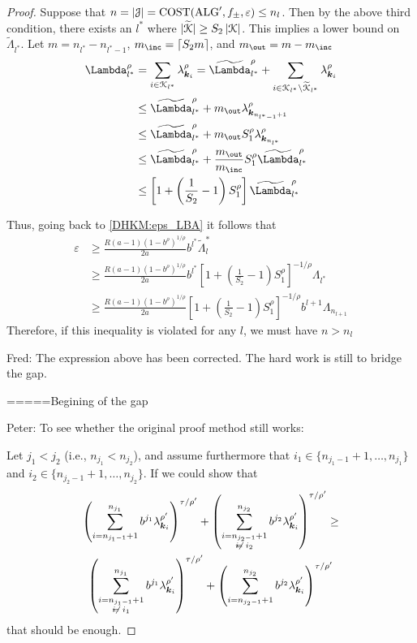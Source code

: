 \documentclass[USenglish]{article}
\theoremstyle{dgthm}
\theoremstyle{dgthm}
\theoremstyle{dgthm}
\theoremstyle{dgthm}
\theoremstyle{dgdef}
\theoremstyle{definition}
\DeclareMathOperator{\ALG}{ALG}
\DeclareMathOperator{\COST}{COST}
\newcommand{\tcalK}{\widetilde{\calK}}
\def\abs#1{\ensuremath{\left \lvert #1 \right \rvert}}
\newcommand{\normabs}[1]{\ensuremath{\lvert #1 \rvert}}
\newcommand{\FredNote}[1]{{\color{blue}Fred: #1}}
\newcommand{\PeterNote}[1]{{\color{orange}Peter: #1}}
\newcommand{\tLambda}{\widetilde{\Lambda}}
\begin{document}
\begin{proof}
{Suppose that $n = \abs{\calJ} = \COST(\ALG',f_{\pm},\varepsilon) \le n_l$.  Then by the above third condition, there exists an $l^*$ where $\normabs{\tcalK} \ge S_2 \abs{\calK}$.  This implies a lower bound on $\tLambda_{l^*}$.  Let $m = n_{l^*} - n_{l^*-1}$, $m_{\inc} = \lceil S_2 m \rceil$, and $m_{\out} = m - m_{\inc}$
\begin{align*}
    \Lambda_{l^*}^\rho & = \sum_{i \in \calK_{l^*}} \lambda_{\bsk_i}^{\rho} =  \tLambda_{l^*}^\rho + \sum_{i \in \calK_{l^*} \setminus \tcalK_{l^*}} \lambda_{\bsk_i}^{\rho}
    \\
    &\le  \tLambda_{l^*}^\rho + m_{\out} \lambda_{\bsk_{n_{l^* -1}+1}}^\rho \\
    &\le  \tLambda_{l^*}^\rho + m_{\out} S_1^\rho \lambda_{\bsk_{n_{l^*}}}^\rho \\
    & \le \tLambda_{l^*}^\rho + \frac{m_{\out}}{m_{\inc}} S_1^\rho \tLambda_{l^*}^\rho \\
    & \le \left[1 + \left(\frac 1 {S_2} -1 \right) S_1^\rho \right] \tLambda_{l^*}^\rho
\end{align*}

Thus, going back to \eqref{DHKM:eps_LBA} it follows that 
\begin{align}
\nonumber
\varepsilon 
& \ge \frac{R(a-1)(1 - b^\rho)^{1/\rho}}{2a} b^{l^*} \tLambda_l^* 
\\
\nonumber
& \ge  \frac{R(a-1)(1 - b^\rho)^{1/\rho}}{2a} b^{l^*} \left[1 + \left(\frac 1 {S_2} -1 \right) S_1^\rho \right]^{-1/\rho} \Lambda_{l^*}
\\
\nonumber
& \ge  \frac{R(a-1)(1 - b^\rho)^{1/\rho}}{2a}  \left[1 + \left(\frac 1 {S_2} -1 \right) S_1^\rho \right]^{-1/\rho} b^{l+1} \Lambda_{n_{l+1}}
\end{align}
Therefore, if this inequality is violated for any $l$, we must have $n>n_l$}

\FredNote{The expression above has been corrected.  The hard work is still to bridge the gap.

=====Begining of the gap}

\PeterNote{To see whether the original proof method still works:

\medskip

Let $j_1<j_2$ (i.e., $n_{j_1} < n_{j_2}$), and assume furthermore 
that $i_1\in \{n_{j_1-1}+1,\ldots,n_{j_1}\}$ and $i_2\in \{n_{j_2-1}+1,\ldots,n_{j_2}\}$. If we could 
show that
\begin{multline*}
 \left(\sum_{i=n_{j_1-1}+1}^{n_{j_1}} b^{j_1} \lambda_{\bsk_i}^{\rho'}\right)^{\tau/\rho'} +
 \left(\sum_{\substack{i=n_{j_2-1}+1\\ i\neq i_2}}^{n_{j_2}} b^{j_2} \lambda_{\bsk_i}^{\rho'}\right)^{\tau/\rho'}\ge\\
  \left(\sum_{\substack{i=n_{j_1-1}+1\\ i \neq i_1}}^{n_{j_1}} b^{j_1} \lambda_{\bsk_i}^{\rho'}\right)^{\tau/\rho'} +
 \left(\sum_{i=n_{j_2-1}+1}^{n_{j_2}} b^{j_2} \lambda_{\bsk_i}^{\rho'}\right)^{\tau/\rho'}
\end{multline*}
that should be enough.

}
\end{proof}
\end{document}
